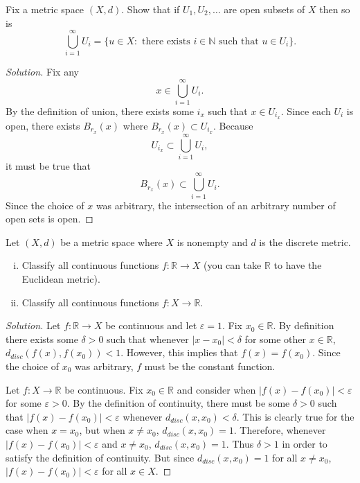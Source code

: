 \documentclass[11pt,letterpaper]{article}
\newcommand{\N}{\mathbb{N}}
\newcommand{\R}{\mathbb{R}}
\newcommand{\eps}{\varepsilon}
\renewcommand{\epsilon}{\eps}
\newenvironment{prob}[1]
  {\renewcommand\theinnerprob{#1}\innerprob}
  {\endinnerprob}
\newenvironment{solution}
  {\renewcommand\qedsymbol{}\begin{proof}[Solution]}
  {\end{proof}\bigskip}
\begin{document}
\begin{prob}{2}  %
Fix a metric space $(X,d)$.  Show that if $U_1, U_2, \dots$ are open subsets of $X$ then so is
\[
	\bigcup_{i=1}^\infty U_i = \{ u \in X : \text{ there exists } i\in\N \text{ such that } u \in U_i\}.
\]
\end{prob}
\begin{solution}
	Fix any $$ x \in \bigcup_{i=1}^\infty U_i.$$ By the definition of union, there exists some $i_x$ such that $x\in U_{i_x}$. Since each $U_i$ is open, there exists $B_{r_x}(x)$ where $B_{r_x}(x) \subset U_{i_x}$. Because $$U_{i_x} \subset \bigcup_{i=1}^\infty U_i,$$ it must be true that $$B_{r_x}(x) \subset \bigcup_{i=1}^\infty U_i.$$ Since the choice of $x$ was arbitrary, the intersection of an arbitrary number of open sets is open. 
\end{solution}
\newpage




\begin{prob}{3}  %
Let $(X, d)$ be a metric space where $X$ is nonempty and $d$ is the discrete metric.
\begin{enumerate}[(i)]
	
	\item Classify all continuous functions $f: \R \to X$ (you can take $\R$ to have the Euclidean metric).
	
	\item Classify all continuous functions $f: X \to \R$.
	
\end{enumerate}
\end{prob}
\begin{solution}
	Let $f: \R \to X$ be continuous and let $\epsilon = 1$. Fix $x_0 \in \R$. By definition there exists some $\delta > 0$ such that whenever $|x-x_0| < \delta$ for some other $x\in \R$, $d_{disc}(f(x),f(x_0)) < 1$. However, this implies that $f(x) = f(x_0)$. Since the choice of $x_0$ was arbitrary, $f$ must be the constant function.
	
	Let $f: X \to \R$ be continuous. Fix $x_0 \in \R$ and consider when $|f(x) - f(x_0)| < \epsilon$ for some $\epsilon > 0$. By the definition of continuity, there must be some $\delta > 0$ such that $|f(x) - f(x_0)| < \epsilon$ whenever $d_{disc}(x,x_0) < \delta$. This is clearly true for the case when $x = x_0$, but when $x\not=x_0$, $d_{disc}(x,x_0) = 1$. Therefore, whenever $|f(x) - f(x_0)| < \epsilon$ and $x \not=x_0$,  $d_{disc}(x,x_0) = 1$. Thus $\delta > 1$ in order to satisfy the definition of continuity. But since $d_{disc}(x,x_0) = 1$ for all $x \not= x_0$, $|f(x) - f(x_0)| < \epsilon$ for all $x \in X$. 
	
\end{solution}
\newpage
\end{document}
